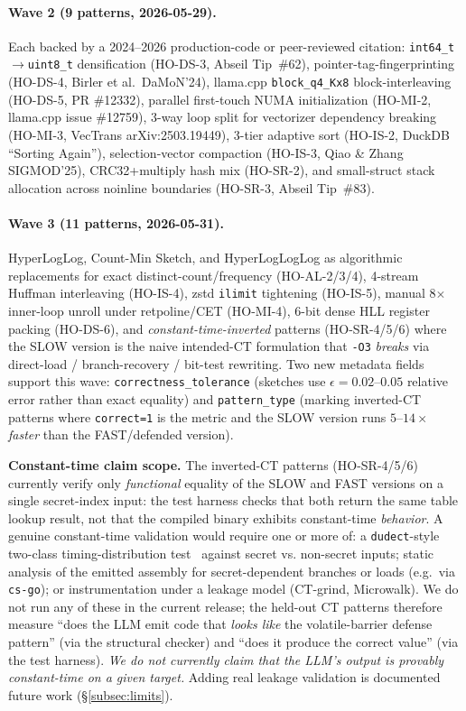 \paragraph{Wave 2 (9 patterns, 2026-05-29).} Each backed by a 2024--2026 production-code or peer-reviewed citation: \texttt{int64\_t}$\to$\texttt{uint8\_t} densification (HO-DS-3, Abseil Tip~\#62), pointer-tag-fingerprinting (HO-DS-4, Birler et al.\ DaMoN'24), llama.cpp \texttt{block\_q4\_Kx8} block-interleaving (HO-DS-5, PR \#12332), parallel first-touch NUMA initialization (HO-MI-2, llama.cpp issue \#12759), 3-way loop split for vectorizer dependency breaking (HO-MI-3, VecTrans arXiv:2503.19449), 3-tier adaptive sort (HO-IS-2, DuckDB ``Sorting Again''), selection-vector compaction (HO-IS-3, Qiao \& Zhang SIGMOD'25), CRC32+multiply hash mix (HO-SR-2), and small-struct stack allocation across noinline boundaries (HO-SR-3, Abseil Tip~\#83).

\paragraph{Wave 3 (11 patterns, 2026-05-31).} HyperLogLog, Count-Min Sketch, and HyperLogLogLog as algorithmic replacements for exact distinct-count/frequency (HO-AL-2/3/4), 4-stream Huffman interleaving (HO-IS-4), zstd \texttt{ilimit} tightening (HO-IS-5), manual 8$\times$ inner-loop unroll under retpoline/CET (HO-MI-4), 6-bit dense HLL register packing (HO-DS-6), and \emph{constant-time-inverted} patterns (HO-SR-4/5/6) where the SLOW version is the naive intended-CT formulation that \texttt{-O3} \emph{breaks} via direct-load / branch-recovery / bit-test rewriting. Two new metadata fields support this wave: \texttt{correctness\_tolerance} (sketches use $\epsilon=0.02$--$0.05$ relative error rather than exact equality) and \texttt{pattern\_type} (marking inverted-CT patterns where \texttt{correct=1} is the metric and the SLOW version runs $5$--$14\times$ \emph{faster} than the FAST/defended version).

\textbf{Constant-time claim scope.} The inverted-CT patterns (HO-SR-4/5/6) currently verify only \emph{functional} equality of the SLOW and FAST versions on a single secret-index input: the test harness checks that both return the same table lookup result, not that the compiled binary exhibits constant-time \emph{behavior}. A genuine constant-time validation would require one or more of: a \texttt{dudect}-style two-class timing-distribution test~\cite{reparaz2017dudect} against secret vs. non-secret inputs; static analysis of the emitted assembly for secret-dependent branches or loads (e.g.\ via \texttt{cs-go}); or instrumentation under a leakage model (CT-grind, Microwalk). We do not run any of these in the current release; the held-out CT patterns therefore measure ``does the LLM emit code that \emph{looks like} the volatile-barrier defense pattern'' (via the structural checker) and ``does it produce the correct value'' (via the test harness). \emph{We do not currently claim that the LLM's output is provably constant-time on a given target.} Adding real leakage validation is documented future work (\S\ref{subsec:limits}).

